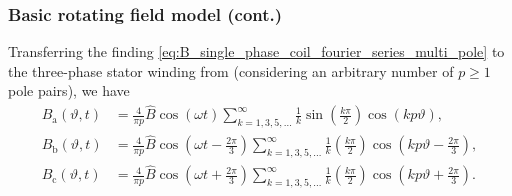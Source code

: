 \begin{frame}
	\frametitle{Basic rotating field model (cont.)}
    Transferring the finding \eqref{eq:B_single_phase_coil_fourier_series_multi_pole} to the three-phase stator winding from  (considering an arbitrary number of $p \geq 1$ pole pairs), we have
    \begin{equation}
        \begin{split}
            B_\mathrm{a}(\vartheta, t) &= \frac{4}{\pi p} \hat{B} \cos(\omega t)\sum_{k=1,3,5,\ldots}^{\infty}   \frac{1}{k}\sin\left(\frac{k \pi}{2}\right) \cos(k p \vartheta),\\
            B_\mathrm{b}(\vartheta, t) &= \frac{4}{\pi p} \hat{B} \cos\left(\omega t - \frac{2\pi}{3}\right)\sum_{k=1,3,5,\ldots}^{\infty}   \frac{1}{k}\left(\frac{k \pi}{2}\right) \cos\left(k p \vartheta - \frac{2\pi}{3}\right),\\ 
            B_\mathrm{c}(\vartheta, t) &= \frac{4}{\pi p} \hat{B} \cos\left(\omega t + \frac{2\pi}{3}\right)\sum_{k=1,3,5,\ldots}^{\infty}   \frac{1}{k}\left(\frac{k \pi}{2}\right) \cos\left(k p \vartheta + \frac{2\pi}{3}\right).
        \end{split}
        \label{eq:B_three_phase_stator_coil_fourier_series}
    \end{equation}
\end{frame}